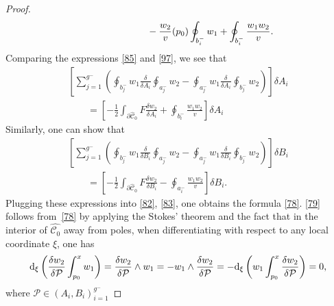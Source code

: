 \documentclass[pdftex]{sigma}
\numberwithin{equation}{section}
\theoremstyle{definition}
\begin{document}
\begin{proof}
\begin{gather}
 \hphantom{\frac{1}{2}\int_{\partial \hat{\mathcal{C}}_0}F\frac{\delta w_2}{\delta A_i}=}{}
 -\frac{w_2}{v}(p_0)\oint_{ b^-_i}w_1+\oint_{ b^-_i}\frac{w_1 w_2}{v}.\label{97}
\end{gather}
Comparing the expressions \eqref{85} and \eqref{97}, we see that
\begin{gather*}%
\left[ \sum^{g^-}_{j=1}\left(\oint_{b^-_j} w_1 \frac{\delta}{\delta A_i}\oint_{a^-_j}w_2-\oint_{a^-_j} w_1 \frac{\delta }{\delta A_i}\oint_{b^-_j}w_2\right)\right]\delta A_i\\
\qquad{} =\left[-\frac{1}{2}\int_{\partial \hat{\mathcal{C}}_0}F\frac{\delta w_2}{\delta A_i}+\oint_{ b^-_i}\frac{w_1 w_2}{v}\right] \delta A_i \end{gather*}
Similarly, one can show that
\begin{gather*}%
\left[ \sum^{g^-}_{j=1}\left(\oint_{b^-_j} w_1 \frac{\delta}{\delta B_i}\oint_{a^-_j}w_2-\oint_{a^-_j} w_1 \frac{\delta}{\delta B_i}\oint_{b^-_j}w_2\right)\right]\delta B_i\\
\qquad{} =\left[-\frac{1}{2}\int_{\partial \hat{\mathcal{C}}_0}F\frac{\delta w_2}{\delta B_i}-\oint_{ a^-_i}\frac{w_1 w_2}{v}\right] \delta B_i.
 \end{gather*}
Plugging these expressions into \eqref{82}, \eqref{83}, one obtains the formula \eqref{78}. \eqref{79} follows from~\eqref{78} by applying the Stokes' theorem and the fact that in the interior of $\hat{\mathcal{C}_0}$ away from poles, when differentiating with respect to any local coordinate $\xi$, one has
\begin{equation*}%
{\rm d}_\xi\left( \frac{\delta w_2}{\delta \mathcal{P} }\int^x_{p_0} w_1\right)=\frac{\delta w_2}{\delta \mathcal{P} } \wedge w_1 =- w_1 \wedge \frac{\delta w_2}{\delta \mathcal{P} }=-{\rm d}_\xi\left(w_1 \int^x_{p_0}\frac{\delta w_2}{\delta \mathcal{P} }\right)=0,
\end{equation*}
where $\mathcal{P} \in (A_i, B_i)^{g^-}_{i=1} $
\end{proof}
\end{document}
